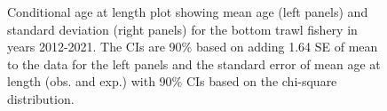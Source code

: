 \documentclass[
]{scrartcl}
\begin{document}
\begin{figure}[H]


\caption{\label{fig-call-plot-bt2}Conditional age at length plot showing
mean age (left panels) and standard deviation (right panels) for the
bottom trawl fishery in years 2012-2021. The CIs are 90\% based on
adding 1.64 SE of mean to the data for the left panels and the standard
error of mean age at length (obs. and exp.) with 90\% CIs based on the
chi-square distribution.}

\end{figure}%
\end{document}
